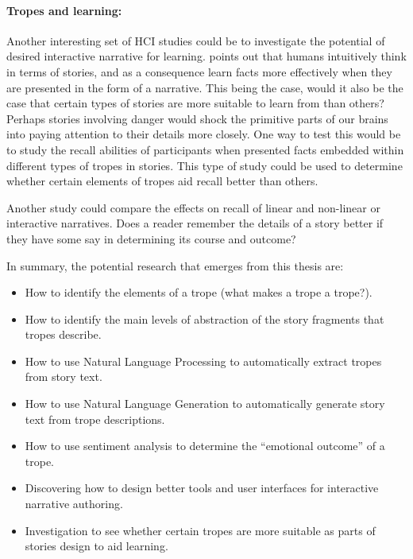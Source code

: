 \documentclass[11pt]{report}
\begin{document}
\paragraph{Tropes and learning:} Another interesting set of HCI studies could be to investigate the potential of
desired interactive narrative for learning. \citet{schank1990tell} points out
that humans intuitively think in terms of stories, and as a consequence learn
facts more effectively when they are presented in the form of a narrative. This
being the case, would it also be the case that certain types of stories are more
suitable to learn from than others? Perhaps stories involving danger would shock
the primitive parts of our brains into paying attention to their details more
closely. One way to test this would be to study the recall abilities of
participants when presented facts embedded within different types of tropes in
stories. This type of study could be used to determine whether certain elements
of tropes aid recall better than others.

Another study could compare the effects on recall of linear and non-linear or
interactive narratives. Does a reader remember the details of a story better if
they have some say in determining its course and outcome?

In summary, the potential research that emerges from this thesis are:

\begin{itemize}
  \item How to identify the elements of a trope (what makes a trope a trope?).
  \item How to identify the main levels of abstraction of the story fragments
    that tropes describe.
  \item How to use Natural Language Processing to automatically extract tropes from story text.
  \item How to use Natural Language Generation to automatically generate story
    text from trope descriptions.
  \item How to use sentiment analysis to determine the ``emotional outcome'' of
    a trope.
  \item Discovering how to design better tools and user interfaces for
    interactive narrative authoring.
  \item Investigation to see whether certain tropes are more suitable as parts
    of stories design to aid learning.
\end{itemize}

\end{document}
